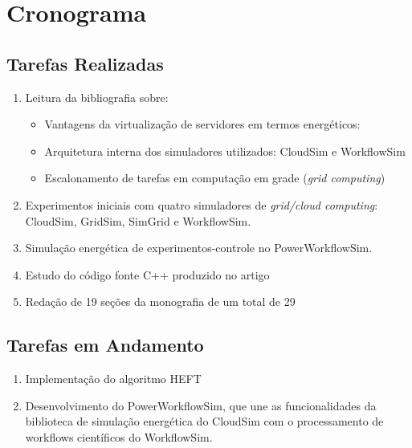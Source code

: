 \chapter{Cronograma}
\label{cap:cronograma}

\section{Tarefas Realizadas}
	\label{sec:tarefas_realizadas}
	\begin{enumerate}
		\item Leitura da bibliografia sobre:
		\begin{itemize}
			\item Vantagens da virtualização de servidores em termos energéticos:
				\cite{barroso:case_energy_proportional}
				\cite{beloglazov:energy_efficient_allocation_virtual_machines}
				\cite{berl:energy_efficient_cloud_computing}
				\cite{feng:green500_encouraging_sustainable_supercomputing}
				\cite{murugesan:harnessing_green_it}
				\cite{vmware:virtualization_right_sizes_it}
				\cite{rivoire:models_metrics_enable_energy_efficient_optimizations}
			\item Arquitetura interna dos simuladores utilizados: CloudSim e WorkflowSim
				\cite{calheiros:cloudsim}
				\cite{chen:workflowsim}
			\item Escalonamento de tarefas em computação em grade (\emph{grid 
			computing})
				\cite{chaves:scheduling_software_requirements}
				\cite{batista:embedding_software_requirements}
		\end{itemize}
		\item Experimentos iniciais com quatro simuladores de \emph{grid/cloud
			computing}: CloudSim, GridSim, SimGrid e WorkflowSim.
		\item Simulação energética de experimentos-controle no PowerWorkflowSim.
		\item Estudo do código fonte C++ produzido no artigo
			\cite{chaves:scheduling_software_requirements} 
		\item Redação de 19 seções da monografia de um total de 29
	\end{enumerate}

\section{Tarefas em Andamento}
\label{sec:tarefas_andamento}
	\begin{enumerate}
		\item Implementação do algoritmo HEFT
		\item Desenvolvimento do PowerWorkflowSim, que une as funcionalidades
		da biblioteca de simulação energética do CloudSim com o processamento de
		workflows científicos do WorkflowSim.
	\end{enumerate}

